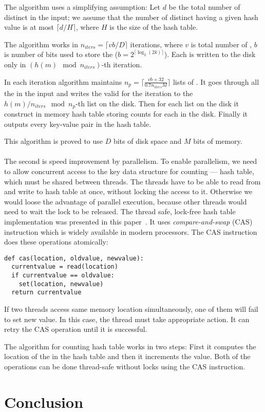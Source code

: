 The algorithm uses a simplifying assumption: Let $d$ be the total number of distinct \kmers in the input; we assume that the number of distinct \kmers having a given hash value is at most $\lceil d/H \rceil$, where $H$ is the size of the hash table\cite{dsk}.

The algorithm works in $n_{iters} = \lceil vb/D\rceil$ iterations, where $v$ is total number of \kmers, $b$ is number of bits used to store the \kmer ($b = 2^{\lceil\log_2(2k)\rceil}$). Each \kmer is written to the disk only in $(h(m) \mod n_{iters})$-th iteration.

In each iteration algorithm maintains $n_p = \lceil\frac{vb+32}{0.7n_{iters}M}\rceil$ lists of \kmers.
It goes through all the \kmers in the input and writes the \kmers valid for the iteration to the $h(m)/n_{iters} \mod n_p$-th list on the disk.
Then for each list on the disk it construct in memory hash table storing counts for each \kmer in the disk.
Finally it outputs every key-value pair in the hash table.

This algorithm is proved to use $D$ bits of disk space and $M$ bits of memory\cite{dsk}.

\paragraph{} The second is speed improvement by parallelism. To enable parallelism, we need to allow concurrent access to the key data structure for \kmer counting --- hash table, which must be shared between threads. The threads have to be able to read from and write to hash table at once, without locking the access to it. Otherwise we would loose the advantage of parallel execution, because other threads would need to wait the lock to be released. The thread safe, lock-free hash table implementation was presented in this paper~\cite{jellyfish}. It uses \emph{compare-and-swap} (CAS) instruction which is widely available in modern processors. The CAS instruction does these operations atomically:
\begin{lstlisting}
def cas(location, oldvalue, newvalue):
  currentvalue = read(location)
  if currentvalue == oldvalue:
    set(location, newvalue)
  return currentvalue
\end{lstlisting}
If two threads access same memory location simultaneously, one of them will fail to set new value. In this case, the thread must take appropriate action.
It can retry the CAS operation until it is successful.

The algorithm for \kmer counting hash table works in two steps:
First it computes the location of the \kmer in the hash table and then it increments the value. Both of the operations can be done thread-safe without locks using the CAS instruction.

\section{Conclusion}
